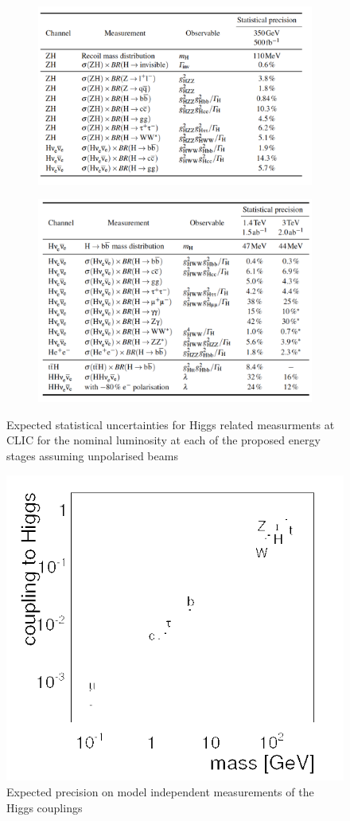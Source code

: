 \begin{figure}
\centering
\begin{subfigure}{.5\textwidth}
  \centering
  \includegraphics[width=.4\linewidth]{Theory/fig/table28_350GeVPrecisions}
  \label{fig:350GeVNumbers}
\end{subfigure}%
\begin{subfigure}{.5\textwidth}
  \centering
  \includegraphics[width=.4\linewidth]{Theory/fig/table29_HighEPrecisions}
  \label{fig:HighENumbers}
\end{subfigure}
\caption[Expected statistical uncertainties for Higgs related measurments at CLIC for the nominal luminosity at each of the proposed energy stages assuming unpolarised beams]{Expected statistical uncertainties for Higgs related measurments at CLIC for the nominal luminosity at each of the proposed energy stages assuming unpolarised beams}
\end{figure}

\begin{figure}
\centering
\includegraphics[width=.4\linewidth]{Theory/fig/HiggsCouplings}
\caption[Expected precision on model independent measurements of the Higgs couplings]{Expected precision on model independent measurements of the Higgs couplings}
\label{fig:modelIndependentCouplings}
\end{figure}


